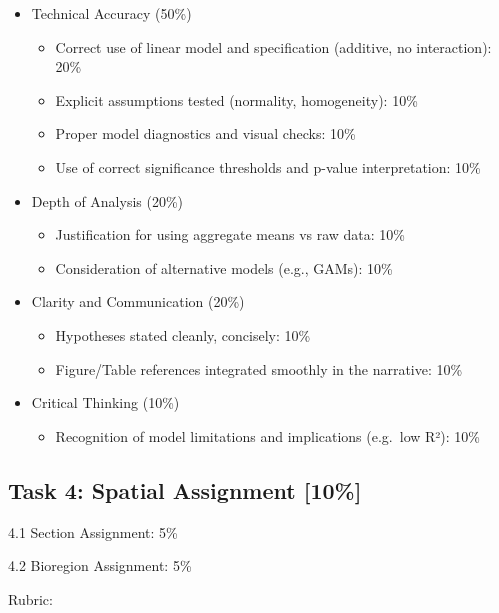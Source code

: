 \documentclass[
  10pt,
]{article}
\providecommand{\tightlist}{%
  \setlength{\itemsep}{0pt}\setlength{\parskip}{0pt}}
\begin{document}
\begin{itemize}
\tightlist
\item
  Technical Accuracy (50\%)

  \begin{itemize}
  \tightlist
  \item
    Correct use of linear model and specification (additive, no
    interaction): 20\%
  \item
    Explicit assumptions tested (normality, homogeneity): 10\%
  \item
    Proper model diagnostics and visual checks: 10\%
  \item
    Use of correct significance thresholds and p-value interpretation:
    10\%
  \end{itemize}
\item
  Depth of Analysis (20\%)

  \begin{itemize}
  \tightlist
  \item
    Justification for using aggregate means vs raw data: 10\%
  \item
    Consideration of alternative models (e.g., GAMs): 10\%
  \end{itemize}
\item
  Clarity and Communication (20\%)

  \begin{itemize}
  \tightlist
  \item
    Hypotheses stated cleanly, concisely: 10\%
  \item
    Figure/Table references integrated smoothly in the narrative: 10\%
  \end{itemize}
\item
  Critical Thinking (10\%)

  \begin{itemize}
  \tightlist
  \item
    Recognition of model limitations and implications (e.g.~low R²):
    10\%
  \end{itemize}
\end{itemize}

\subsection{Task 4: Spatial Assignment
{[}10\%{]}}\label{task-4-spatial-assignment-10}

4.1 Section Assignment: 5\%

4.2 Bioregion Assignment: 5\%

Rubric:
\end{document}
